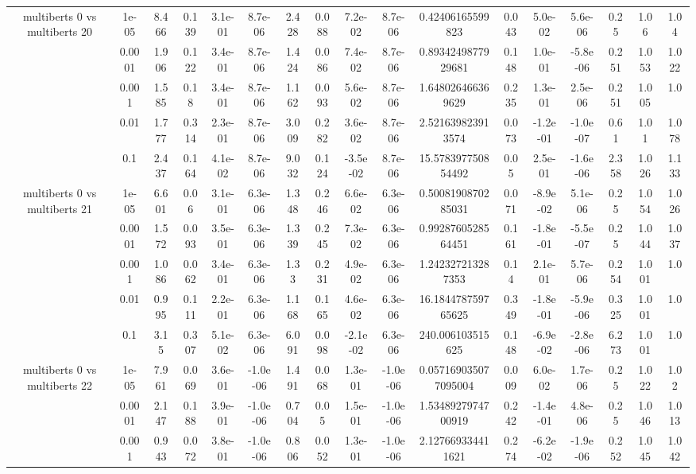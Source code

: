\begin{tabular}{|c|c|c|c|c|c|c|c|c|c|c|c|c|c|c|c|c|}
\hline
\multirow{5}{*}{multiberts 0 vs multiberts 20} & 1e-05 & 8.466 & 0.139 & 3.1e-01 & 8.7e-06 & 2.428 & 0.088 & 7.2e-02 & 8.7e-06 & 0.42406165599823 & 0.043 & 5.0e-02 & 5.6e-06 & 0.25 & 1.06 & 1.04 \\
 & 0.0001 & 1.906 & 0.122 & 3.4e-01 & 8.7e-06 & 1.424 & 0.086 & 7.4e-02 & 8.7e-06 & 0.8934249877929681 & 0.148 & 1.0e-01 & -5.8e-06 & 0.251 & 1.053 & 1.022 \\
 & 0.001 & 1.585 & 0.18 & 3.4e-01 & 8.7e-06 & 1.162 & 0.093 & 5.6e-02 & 8.7e-06 & 1.648026466369629 & 0.235 & 1.3e-01 & 2.5e-06 & 0.251 & 1.005 & 1.0 \\
 & 0.01 & 1.777 & 0.314 & 2.3e-01 & 8.7e-06 & 3.009 & 0.282 & 3.6e-02 & 8.7e-06 & 2.521639823913574 & 0.073 & -1.2e-01 & -1.0e-07 & 0.61 & 1.01 & 1.078 \\
 & 0.1 & 2.437 & 0.164 & 4.1e-02 & 8.7e-06 & 9.032 & 0.124 & -3.5e-02 & 8.7e-06 & 15.578397750854492 & 0.05 & 2.5e-01 & -1.6e-06 & 2.358 & 1.026 & 1.133 \\
\hline
\multirow{5}{*}{multiberts 0 vs multiberts 21} & 1e-05 & 6.601 & 0.06 & 3.1e-01 & 6.3e-06 & 1.348 & 0.246 & 6.6e-02 & 6.3e-06 & 0.5008190870285031 & 0.071 & -8.9e-02 & 5.1e-06 & 0.25 & 1.054 & 1.026 \\
 & 0.0001 & 1.572 & 0.093 & 3.5e-01 & 6.3e-06 & 1.339 & 0.245 & 7.3e-02 & 6.3e-06 & 0.9928760528564451 & 0.161 & -1.8e-01 & -5.5e-07 & 0.25 & 1.044 & 1.037 \\
 & 0.001 & 1.086 & 0.062 & 3.4e-01 & 6.3e-06 & 1.33 & 0.231 & 4.9e-02 & 6.3e-06 & 1.242327213287353 & 0.14 & 2.1e-01 & 5.7e-06 & 0.254 & 1.001 & 1.0 \\
 & 0.01 & 0.995 & 0.111 & 2.2e-01 & 6.3e-06 & 1.168 & 0.165 & 4.6e-02 & 6.3e-06 & 16.184478759765625 & 0.349 & -1.8e-01 & -5.9e-06 & 0.325 & 1.001 & 1.0 \\
 & 0.1 & 3.15 & 0.307 & 5.1e-02 & 6.3e-06 & 6.091 & 0.098 & -2.1e-02 & 6.3e-06 & 240.006103515625 & 0.148 & -6.9e-02 & -2.8e-06 & 6.273 & 1.001 & 1.0 \\
\hline
\multirow{5}{*}{multiberts 0 vs multiberts 22} & 1e-05 & 7.961 & 0.069 & 3.6e-01 & -1.0e-06 & 1.491 & 0.068 & 1.3e-01 & -1.0e-06 & 0.057169035077095004 & 0.009 & 6.0e-02 & 1.7e-06 & 0.25 & 1.022 & 1.02 \\
 & 0.0001 & 2.147 & 0.188 & 3.9e-01 & -1.0e-06 & 0.704 & 0.05 & 1.5e-01 & -1.0e-06 & 1.5348927974700919 & 0.242 & -1.4e-01 & 4.8e-06 & 0.25 & 1.046 & 1.013 \\
 & 0.001 & 0.943 & 0.072 & 3.8e-01 & -1.0e-06 & 0.806 & 0.052 & 1.3e-01 & -1.0e-06 & 2.127669334411621 & 0.274 & -6.2e-02 & -1.9e-06 & 0.252 & 1.045 & 1.042 \\

\end{tabular}
